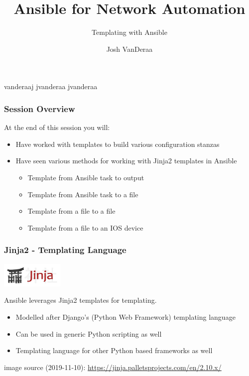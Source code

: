 \documentclass[aspectratio=169]{beamer}
\title{Ansible for Network Automation}
\subtitle{Templating with Ansible}
\date{}
\author{Josh VanDeraa}
\begin{document}
\begin{frame}
  \maketitle
  \footnotesize
  \faTwitter vanderaaj \hfill \faGithub jvanderaa \hfill \faSlack jvanderaa
\end{frame}

\begin{frame}
    \frametitle{Session Overview}
    At the end of this session you will:
    \begin{itemize}
      \item <2-> Have worked with templates to build various configuration stanzas
      \item <3-> Have seen various methods for working with Jinja2 templates in Ansible
      \begin{itemize}
          \item <3-> Template from Ansible task to output
          \item <4-> Template from Ansible task to a file
          \item <5-> Template from a file to a file
          \item <6-> Template from a file to an IOS device
      \end{itemize}
    \end{itemize}
  \end{frame}

  \begin{frame}[t]
    \frametitle{Jinja2 - Templating Language}
      \begin{center}
        \includegraphics[width=3cm]{assets/jinja-logo.png}
      \end{center}
      Ansible leverages Jinja2 templates for templating.
      \begin{itemize}
          \item Modelled after Django's (Python Web Framework) templating language
          \item Can be used in generic Python scripting as well
          \item Templating language for other Python based frameworks as well
      \end{itemize}
      \tiny
      \vfill
      image source (2019-11-10): \url{https://jinja.palletsprojects.com/en/2.10.x/}
  \end{frame}
\end{document}
